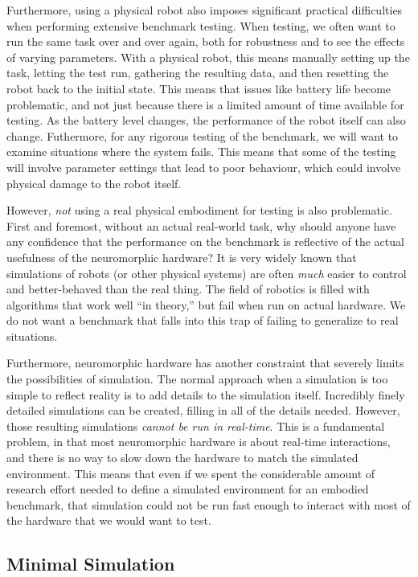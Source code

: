 \documentclass{frontiersSCNS} %
\begin{document}
Furthermore, using a physical robot also imposes significant practical
difficulties when performing extensive benchmark testing.  When testing, we
often want to run the same task over and over again, both for robustness and
to see the effects of varying parameters.  With a physical robot, this means
manually setting up the task, letting the test run, gathering the resulting
data, and then resetting the robot back to the initial state.  This means that
issues like battery life become problematic, and not just because there is a
limited amount of time available for testing.  As the battery level changes,
the performance of the robot itself can also change.  Futhermore, for any
rigorous testing of the benchmark, we will want to examine situations where
the system fails.  This means that some of the testing will involve parameter
settings that lead to poor behaviour, which could involve physical damage to
the robot itself.

However, \emph{not} using a real physical embodiment for testing is also
problematic.  First and foremost, without an actual real-world task, why
should anyone have any confidence that the performance on the benchmark is
reflective of the actual usefulness of the neuromorphic hardware?  It is
very widely known that simulations of robots (or other physical systems) are
often \emph{much} easier to control and better-behaved than the real thing.  The
field of robotics is filled with algorithms that work well ``in theory,'' but
fail when run on actual hardware.  We do not want a benchmark that falls into
this trap of failing to generalize to real situations.

Furthermore, neuromorphic hardware has another constraint that severely limits
the possibilities of simulation.  The normal approach when a simulation is
too simple to reflect reality is to add details to the simulation itself.
Incredibly finely detailed simulations can be created, filling in all of the
details needed.  However, those resulting simulations \emph{cannot be run
in real-time}.  This is a fundamental problem, in that most neuromorphic
hardware is about real-time interactions, and there is no way to slow down
the hardware to match the simulated environment.  This means that even if
we spent the considerable amount of research effort needed to define a
simulated environment for an embodied benchmark, that simulation could not
be run fast enough to interact with most of the hardware that we would want
to test.

\subsection{Minimal Simulation}
\end{document}
